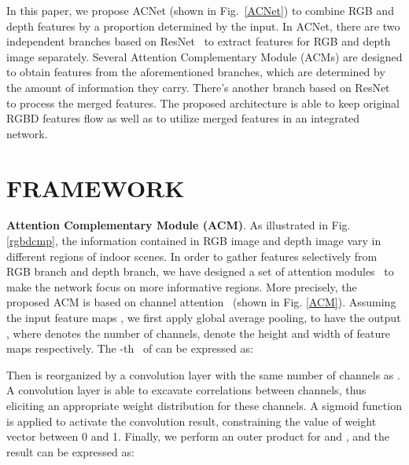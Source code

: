 \documentclass{article}
\begin{document}
In this paper, we propose ACNet (shown in Fig.~\ref{ACNet}) to combine RGB and depth features by a proportion determined by the input. In ACNet, there are two independent branches based on ResNet~\cite{he2016deepresnet} to extract features for RGB and depth image separately. Several Attention Complementary Module (ACMs) are designed to obtain features from the aforementioned branches, which are determined by the amount of information they carry. There's another branch based on ResNet to process the merged features. The proposed architecture is able to keep original RGBD features flow as well as to utilize merged features in an integrated network.


















\section{FRAMEWORK}
\label{sec:framework}



\textbf{Attention Complementary Module (ACM)}. As illustrated in Fig. \ref{rgbdcmp}, the information contained in RGB image and depth image vary in different regions of indoor scenes. In order to gather features selectively from RGB branch and depth branch, we have designed a set of attention modules~\cite{hu2017squeeze} to make the network focus on more informative regions. More precisely, the proposed ACM is based on channel attention~\cite{zhang2018imagechannelattention} (shown in Fig. \ref{ACM}). Assuming the input feature maps , we first apply global average pooling, to have the output , where  denotes the number of channels,  denote the height and width of feature maps respectively. The -th~ of  can be expressed as:



Then  is reorganized by a  convolution layer with the same number of channels as . A  convolution layer is able to excavate correlations between channels, thus eliciting an appropriate weight distribution for these channels. A sigmoid function is applied to activate the convolution result, constraining the value of weight vector  between 0 and 1. Finally, we perform an outer product for  and , and the result  can be expressed as:
\end{document}
